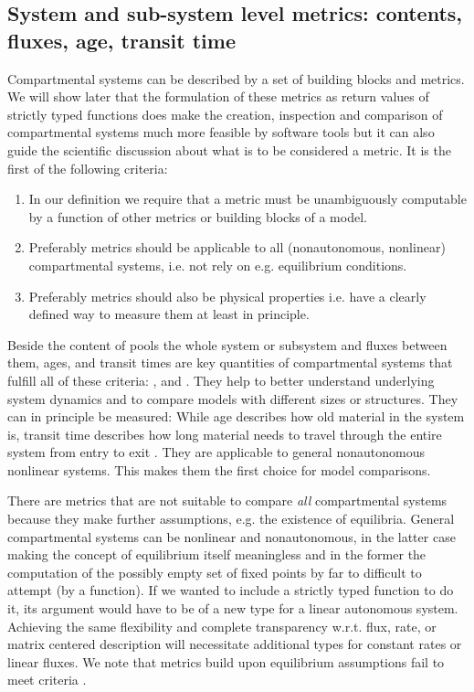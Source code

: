 \subsection{System and sub-system level metrics: contents, fluxes, age, transit time}
Compartmental systems can be described by a set of building blocks and metrics. 
We will show later that the formulation of these metrics as return values of
strictly typed functions does make the creation, inspection and
comparison of compartmental systems much more feasible by software tools  
but it can also guide the scientific discussion about what is to be considered a metric.
It is the first of the following criteria:
\begin{enumerate}
  \item
    \label{enum:function}
    In our definition we require that a metric must be unambiguously computable by a function of other metrics or building blocks of a model. 
  \item
    \label{enum:general}
    Preferably metrics should be applicable to all (nonautonomous, nonlinear) compartmental systems, i.e. not rely on e.g. equilibrium conditions.
  \item
    \label{enum:measurable}
  Preferably metrics should also be physical properties
  i.e. have a clearly defined way to measure them at least in principle.
\end{enumerate}

Beside the content of pools the whole system or subsystem and fluxes between
them, ages, and transit times are key quantities of compartmental systems that
fulfill all of these criteria: ,  and
.
They help to better understand underlying system dynamics and to compare models
with different sizes or structures.  They can in principle be measured: While
age describes how old material in the system is, transit time describes how
long material needs to travel through the entire system from entry to exit
\citep{bolin1973Tellus, Sierra2017GCB}.  They are applicable to general
nonautonomous nonlinear systems.  This makes them the first choice for model
comparisons. 

There are metrics that are not suitable to compare \emph{all} compartmental systems because they make further assumptions, e.g. the existence of equilibria. 
General compartmental systems can be nonlinear and nonautonomous, in the latter case making the concept of equilibrium itself meaningless and in the former the computation of the possibly empty set of fixed points by far to difficult to attempt (by a function).
If we wanted to include a strictly typed function to do it, its argument would
have to be of a new type for a linear autonomous system.  Achieving the same flexibility
and complete transparency w.r.t. flux, rate, or matrix centered description
will necessitate additional types for constant rates or linear fluxes.
We note that metrics build upon equilibrium assumptions fail to meet criteria .

